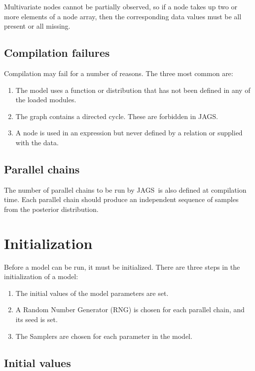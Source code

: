 \documentclass[11pt, a4paper, titlepage]{report}
\newcommand{\JAGS}{\textsf{JAGS}}
\begin{document}
Multivariate nodes cannot be partially observed, so if a node takes up
two or more elements of a node array, then the corresponding data
values must be all present or all missing.

\subsection{Compilation failures}

Compilation may fail for a number of reasons. The three most common are:
\begin{enumerate}
\item The model uses a function or distribution that has not been
  defined in any of the loaded modules. %
\item The graph contains a directed cycle.  These are forbidden
  in \JAGS.
\item A node is used in an expression but never defined by a relation
  or supplied with the data.
\end{enumerate}

\subsection{Parallel chains}

The number of parallel chains to be run by \JAGS\ is also defined at
compilation time.  Each parallel chain should produce an independent
sequence of samples from the posterior distribution.

\section{Initialization}

Before a model can be run, it must be initialized. There are three
steps in the initialization of a model:
\begin{enumerate}
\item The initial values of the model parameters are set.
\item A Random Number Generator (RNG) is chosen for each parallel chain,
  and its seed is set.
\item The Samplers are chosen for each parameter in the model. 
\end{enumerate}

\subsection{Initial values}
\end{document}
